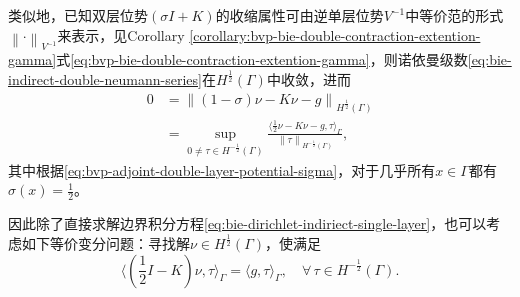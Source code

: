类似地，已知双层位势$\left( \sigma I + K \right)$的收缩属性可由逆单层位势$V^{-1}$中等价范的形式$\left\| \cdot \right\|_{V^{-1}}$来表示，见Corollary \ref{corollary:bvp-bie-double-contraction-extention-gamma}式\eqref{eq:bvp-bie-double-contraction-extention-gamma}，则诺依曼级数\eqref{eq:bie-indirect-double-neumann-series}在$H^{\frac{1}{2}}(\Gamma)$中收敛，进而
\begin{equation*}
  \begin{split}
    0 & = \left\| \left( 1 - \sigma \right) \nu - K \nu - g \right\|_{H^{\frac{1}{2}}(\Gamma)} \\
    & = \sup_{0 \neq \tau \in H^{-\frac{1}{2}}(\Gamma)}
    \frac{
    \langle \frac{1}{2} \nu - K \nu - g, \tau \rangle_{\Gamma}
    }{
    \left\| \tau \right\|_{H^{-\frac{1}{2}}(\Gamma)}
    },
  \end{split}
\end{equation*}
其中根据\eqref{eq:bvp-adjoint-double-layer-potential-sigma}，对于几乎所有$x \in \Gamma$都有$\sigma(x) = \frac{1}{2}$。

因此除了直接求解边界积分方程\eqref{eq:bie-dirichlet-indiriect-single-layer}，也可以考虑如下等价变分问题：寻找解$\nu \in H^{\frac{1}{2}}(\Gamma)$，使满足
\begin{equation}
  \label{eq:bie-dirichlet-indirict-variational}
  \langle \left( \frac{1}{2} I - K \right) \nu, \tau \rangle_{\Gamma}
  = \langle g, \tau \rangle_{\Gamma}, \quad \forall \, \tau \in H^{-\frac{1}{2}}(\Gamma).
\end{equation}

